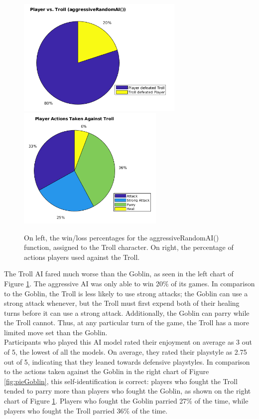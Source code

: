 \begin{figure}[H]
  \centering
  \includegraphics[width=8cm]{figures/trollWins.png}
  \includegraphics[width=7cm]{figures/actionsTroll.png}
  \caption{On left, the win/loss percentages for the aggressiveRandomAI() function, assigned to the Troll character. On right, the percentage of actions players used against the Troll.}
  \label{fig:pieTroll}
\end{figure}

The Troll AI fared much worse than the Goblin, as seen in the left chart of Figure \ref{fig:pieTroll}. The aggressive AI was only able to win 20\% of its games. In comparison to the Goblin, the Troll is less likely to use strong attacks; the Goblin can use a strong attack whenever, but the Troll must first expend both of their healing turns before it can use a strong attack. Additionally, the Goblin can parry while the Troll cannot. Thus, at any particular turn of the game, the Troll has a more limited move set than the Goblin.\\

Participants who played this AI model rated their enjoyment on average as 3 out of 5, the lowest of all the models. On average, they rated their playstyle as 2.75 out of 5, indicating that they leaned towards defensive playstyles. In comparison to the actions taken against the Goblin in the right chart of Figure \ref{fig:pieGoblin}, this self-identification is correct: players who fought the Troll tended to parry more than players who fought the Goblin, as shown on the right chart of Figure \ref{fig:pieTroll}. Players who fought the Goblin parried 27\% of the time, while players who fought the Troll parried 36\% of the time.\\

